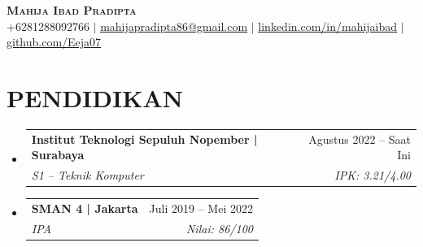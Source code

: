 \documentclass[letterpaper,11pt]{article}
\makeatletter
\newcommand{\resumeSubheading}[4]{
	\vspace{-2pt}\item
	\begin{tabular*}{0.97\textwidth}[t]{l@{\extracolsep{\fill}}r}
		\textbf{#1} & #2 \\
		\textit{\small#3} & \textit{\small #4} \\
	\end{tabular*}\vspace{-7pt}
}
\newcommand{\resumeSubHeadingListStart}{\begin{itemize}[leftmargin=0.15in, label={}]}
\newcommand{\resumeSubHeadingListEnd}{\end{itemize}}
\makeatother
\begin{document}
	
	
	\begin{center}
		\textbf{\Huge \scshape Mahija Ibad Pradipta} \\ \vspace{1pt}
		\small +6281288092766 $|$ \href{mailto:mahijapradipta86@gmail.com}{\underline{mahijapradipta86@gmail.com}} $|$ 
		\href{https://linkedin.com/in/mahijaibad}{\underline{linkedin.com/in/mahijaibad}} $|$
		\href{https://github.com/Eeja07}{\underline{github.com/Eeja07}}
	\end{center}
	
	
	\section{PENDIDIKAN}
	\resumeSubHeadingListStart
	\resumeSubheading
	{Institut Teknologi Sepuluh Nopember | Surabaya}{Agustus 2022 – Saat Ini}
	{S1 – Teknik Komputer}{IPK: 3.21/4.00}
	\resumeSubheading
	{SMAN 4 | Jakarta}{Juli 2019 – Mei 2022}
	{IPA}{Nilai: 86/100}
	\resumeSubHeadingListEnd
	
\end{document}
